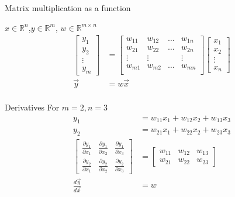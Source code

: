 \begin{frame}{Matrix multiplication as a function}
		\begin{block}{$x \in \mathbb{R}^n$,$y \in \mathbb{R}^m$, $w\in \mathbb{R}^{m \times n}$}
			\begin{align*}
				\begin{bmatrix}
					y_1 \\
					y_2 \\
					\vdots \\
					y_m
				\end{bmatrix} & =  
				\begin{bmatrix}
					w_{11} & w_{12}& \dots & w_{1n}  \\
					w_{21} & w_{22}& \dots & w_{2n}  \\
					\vdots &\vdots &  & \vdots  \\
					w_{m1} & w_{m2}& \dots & w_{mn}  \\
				\end{bmatrix}
			\begin{bmatrix}
				x_1 \\
				x_2 \\
				\vdots \\
				x_n
			\end{bmatrix} \\
		\vec{y} &=w\vec{x} \\
			\end{align*}

		\end{block}
\end{frame}
\begin{frame}{Derivatives}
	For $m=2, n=3$
	\begin{align}
		y_1 &= w_{11}x_1 + w_{12}x_2+w_{13}x_3  \\
		y_2 &= w_{21}x_1 + w_{22}x_2+w_{23}x_3  \\ 
		\begin{bmatrix}
			\frac{\partial y_1}{\partial x_1} & 
				\frac{\partial y_1}{\partial x_2}& 
				\frac{\partial y_1}{\partial x_3}  \\
			\frac{\partial y_2}{\partial x_1}  & 
				\frac{\partial y_2}{\partial x_2}  & 
				\frac{\partial y_2}{\partial x_3}  
		\end{bmatrix} &= 
		\begin{bmatrix}
			w_{11} &  w_{12} & 	w_{13} \\
			w_{21} &  w_{22} & 	w_{23} 
		\end{bmatrix} \\
		\frac{d\vec{y}}{d\vec{x}} &=w 
	\end{align}
\end{frame}
